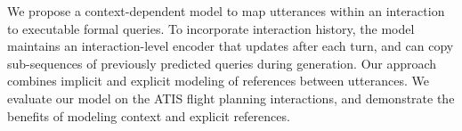 We propose a context-dependent model to map utterances within an interaction to executable formal queries. To incorporate interaction history, the model maintains an interaction-level encoder that updates after each turn, and can copy sub-sequences of previously predicted queries during generation. Our approach combines implicit and explicit modeling of references between utterances. We evaluate our model on the ATIS flight planning interactions, and demonstrate the benefits of modeling context and explicit references.
